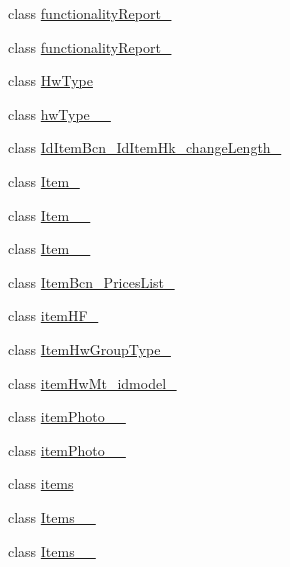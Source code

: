 \begin{DoxyCompactItemize}
\item 
class \mbox{\hyperlink{class_h_k_supply_1_1_migrations_1_1functionality_report__01}{functionality\+Report\+\_}}
\item 
class \mbox{\hyperlink{class_h_k_supply_1_1_migrations_1_1functionality_report__02}{functionality\+Report\+\_}}
\item 
class \mbox{\hyperlink{class_h_k_supply_1_1_migrations_1_1_hw_type}{Hw\+Type}}
\item 
class \mbox{\hyperlink{class_h_k_supply_1_1_migrations_1_1hw_type__25042014__01}{hw\+Type\+\_\+\_}}
\item 
class \mbox{\hyperlink{class_h_k_supply_1_1_migrations_1_1_id_item_bcn___id_item_hk__change_length__011}{Id\+Item\+Bcn\+\_\+\+Id\+Item\+Hk\+\_\+change\+Length\+\_}}
\item 
class \mbox{\hyperlink{class_h_k_supply_1_1_migrations_1_1_item__11042017}{Item\+\_}}
\item 
class \mbox{\hyperlink{class_h_k_supply_1_1_migrations_1_1_item__11042017__2}{Item\+\_\+\_}}
\item 
class \mbox{\hyperlink{class_h_k_supply_1_1_migrations_1_1_item__11042017__3}{Item\+\_\+\_}}
\item 
class \mbox{\hyperlink{class_h_k_supply_1_1_migrations_1_1_item_bcn___prices_list__1}{Item\+Bcn\+\_\+\+Prices\+List\+\_}}
\item 
class \mbox{\hyperlink{class_h_k_supply_1_1_migrations_1_1item_h_f__01}{item\+H\+F\+\_}}
\item 
class \mbox{\hyperlink{class_h_k_supply_1_1_migrations_1_1_item_hw_group_type__01}{Item\+Hw\+Group\+Type\+\_}}
\item 
class \mbox{\hyperlink{class_h_k_supply_1_1_migrations_1_1item_hw_mt__idmodel__01}{item\+Hw\+Mt\+\_\+idmodel\+\_}}
\item 
class \mbox{\hyperlink{class_h_k_supply_1_1_migrations_1_1item_photo__20160418__1}{item\+Photo\+\_\+\_}}
\item 
class \mbox{\hyperlink{class_h_k_supply_1_1_migrations_1_1item_photo__20160418__2}{item\+Photo\+\_\+\_}}
\item 
class \mbox{\hyperlink{class_h_k_supply_1_1_migrations_1_1items}{items}}
\item 
class \mbox{\hyperlink{class_h_k_supply_1_1_migrations_1_1_items__12042017__1}{Items\+\_\+\_}}
\item 
class \mbox{\hyperlink{class_h_k_supply_1_1_migrations_1_1_items__12042017__2}{Items\+\_\+\_}}

\end{DoxyCompactItemize}
